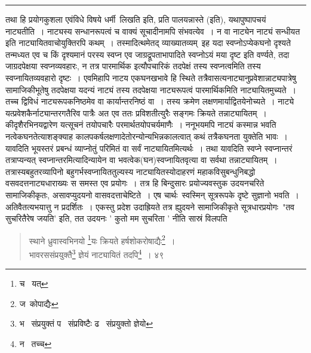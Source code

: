 \documentclass[11pt, openany]{book}
\begin{document}
{\hrule

\vspace{2mm}

तथा हि प्रयोगकुशला एवंविधे विषये धर्मी\textendash\ लिखति इति, प्रति पालयन्नास्ते (इति), यथापुष्पापचयं नाट्यतीति~। नाट्यस्य सन्धानरूपत्वं च वाक्यं सूचादीनामपि संभवत्येव~। न वा नाट्येन नाट्यं सन्धीयत इति नाट्यायितवाचोयुक्तिरपि कथम्~। तस्मादित्थमेतद् व्याख्यातव्यम्\textendash\ इह यदा स्वप्नोऽप्येकघनो दृश्यते तन्मध्यत एव च किं दृश्यमानं परस्य स्वप्न एव जाग्रद्रूपताभापादिते स्वप्नोऽयं मया दृष्ट इति वर्ण्यते, तदा जाग्रदपेक्षया स्वप्नव्यवहारः, न तत्र पारमार्थिक इत्यौपचारिकं तदपेक्षं तस्य स्वप्नत्वमिति तस्य स्वप्नायितव्यवहारो दृष्टः~। एवमिहापि नाटय एकघनखभावे हि स्थिते तत्रैवासत्यनाट्यानुप्रवेशान्नाट्यपात्रेषु सामाजिकीभूतेषु तदपेक्षया यदन्यं नाट्यं तस्य तदपेक्षया नाट्यरूपत्वं पारमार्थिकमिति नाट्यायितमुच्यते~। तच्च द्विविधं नाट्यरूपकनिष्ठमेव वा कार्यान्तरनिष्ठं वा~। तस्य क्रमेण लक्षणमार्याद्वितयेनोच्यते~। नाट्ये यत्प्रवेशकैर्नाट्यान्तरगतैरिव पात्रैः अत एव ततः प्रविशतीत्युरैः सङ्गमः क्रियते तन्नाट्यायितम्~। कीदृशैरभिनयद्वारेण यत्सूचनं तयोपचारैः परमार्थतयोपचर्यमाणैः~। ननूभयमपि नाट्यं कस्मान्न भवति नत्वेकघनतेत्याशङ्क्याह कालपकर्षलक्षणादेतोरन्योन्यभिन्नकालत्वात् कथं तत्रैकघनता युक्तेति भावः~। यावदिति भूयस्तरं प्रबन्धं व्याप्नोतुं परिमितं वा सर्वं नाट्यायितमित्यर्थः~। तथा यावदिति स्वप्ने स्वप्नान्तरं तत्राप्यन्यत् स्वप्नान्तरमित्यादिन्यायेन वा भवत्वेक(घन)स्वप्नायितवृत्या वा सर्वथा तन्नाट्यायितम्~। तत्रास्यबहुतरव्यापिनो बहुगर्भस्वप्नायिततुल्यस्य नाट्यायितस्योदाहरणं महाकविसुबन्धुनिबद्धो वसवदत्तनाट्यधाराख्यः स समस्त एव प्रयोगः~। तत्र हि बिन्दुसारः प्रयोज्यवस्तुक उदयनचरिते सामाजिकीकृतः, असावप्युदयनो वासवदत्ताचेष्टिते~। एष चार्थः\textendash\ स्वस्मिन् सूत्ररूपके दृष्टे सुज्ञानो भवति~। अतिवैतत्यभयात्तु न प्रदर्शितः~। एकस्तु प्रदेश उदाह्रियते तत्र ह्युदयने सामाजिकीकृते सूत्रधारप्रयोगः\textendash\ "तव सुचरितैरेष जयति' इति, तत उदयनः ' कुतो मम सुचरिता ' नीति सास्रं विलपति\textendash\ 

\newpage

\begin{quote}
 {\na स्थाने ध्रुवास्वभिनयो \renewcommand{\thefootnote}{1}\footnote{च \textendash\ यत् }यः क्रियते हर्षशोकरोषाद्यैः\renewcommand{\thefootnote}{2}\footnote{ज\textendash\ कोपाद्यैः}~। \\
भावरससंप्रयुक्तै\renewcommand{\thefootnote}{3}\footnote{भ \textendash\ संप्रयुक्तं प \textendash\ संप्रविष्टैः ढ \textendash\ संप्रयुक्तो ज्ञेयो} ज्ञेयं नाट्यायितं तदपि\renewcommand{\thefootnote}{4}\footnote{न \textendash\ तच्च}~। ४९}
\end{quote}

}
\end{document}
